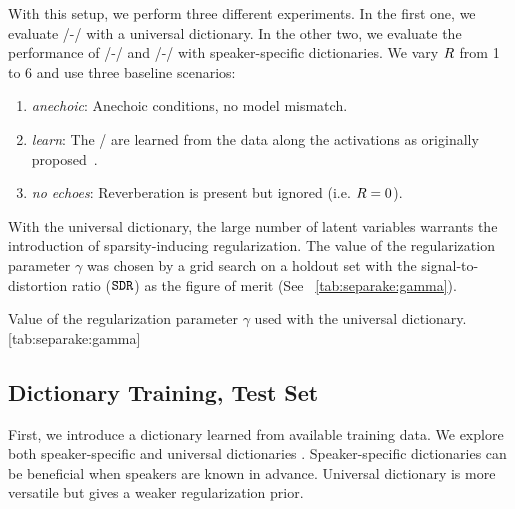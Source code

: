 \mynewline
With this setup, we perform three different experiments.
In the first one, we evaluate \MU/-\NMF/ with a universal dictionary.
In the other two, we evaluate the performance of \MU/-\NMF/ and \EM/-\NMF/ with speaker-specific dictionaries.
We vary $R$ from 1 to 6 and use three baseline scenarios:
\begin{enumerate}
\item \textit{anechoic}: Anechoic conditions, no model mismatch.
\item \textit{learn}: The \RTFs/ are learned from the data along the activations as originally proposed~.
\item \textit{no echoes}: Reverberation is present but ignored (i.e. $R=0$).
\end{enumerate}
With the universal dictionary, the large number of latent variables warrants the introduction of sparsity-inducing regularization.
The value of the regularization parameter $\gamma$ was chosen by a grid search on a holdout set with the signal-to-distortion ratio ($\mathtt{SDR}$) as the figure of merit  (See ~\cref{tab:separake:gamma}).

\begin{table}
    \begin{sidecaption}[]{
        Value of the regularization parameter $\gamma$ used with the universal dictionary.
        }[tab:separake:gamma]
        \centering
        \small
        
    \end{sidecaption}
\end{table}


\subsection{Dictionary Training, Test Set}\label{subsec:separake:dictionary}
First, we introduce a dictionary learned from available training data.
We explore both speaker-specific and universal dictionaries .
Speaker-specific dictionaries can be beneficial when speakers are known in advance.
Universal dictionary is more versatile but gives a weaker regularization prior.

\begin{figure}[h]
    \begin{fullwidth}
    \centering
    \hfill
    \label{fig:separake:results}
    \end{fullwidth}
\end{figure}



